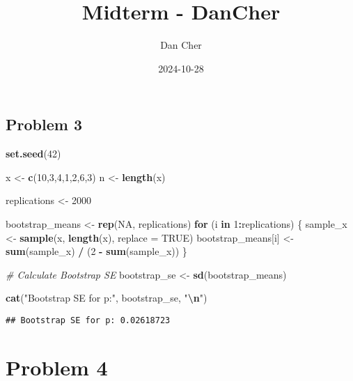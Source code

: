 \documentclass[
]{article}
\title{Midterm - DanCher}
\author{Dan Cher}
\date{2024-10-28}
\newenvironment{Shaded}{\begin{snugshade}}{\end{snugshade}}
\newcommand{\AttributeTok}[1]{\textcolor[rgb]{0.13,0.29,0.53}{#1}}
\newcommand{\CommentTok}[1]{\textcolor[rgb]{0.56,0.35,0.01}{\textit{#1}}}
\newcommand{\ConstantTok}[1]{\textcolor[rgb]{0.56,0.35,0.01}{#1}}
\newcommand{\ControlFlowTok}[1]{\textcolor[rgb]{0.13,0.29,0.53}{\textbf{#1}}}
\newcommand{\DecValTok}[1]{\textcolor[rgb]{0.00,0.00,0.81}{#1}}
\newcommand{\FunctionTok}[1]{\textcolor[rgb]{0.13,0.29,0.53}{\textbf{#1}}}
\newcommand{\NormalTok}[1]{#1}
\newcommand{\OtherTok}[1]{\textcolor[rgb]{0.56,0.35,0.01}{#1}}
\newcommand{\SpecialCharTok}[1]{\textcolor[rgb]{0.81,0.36,0.00}{\textbf{#1}}}
\newcommand{\StringTok}[1]{\textcolor[rgb]{0.31,0.60,0.02}{#1}}
\begin{document}
\maketitle

\subsection{Problem 3}\label{problem-3}

\begin{Shaded}
\begin{Highlighting}[]
\FunctionTok{set.seed}\NormalTok{(}\DecValTok{42}\NormalTok{)}

\NormalTok{x }\OtherTok{\textless{}{-}} \FunctionTok{c}\NormalTok{(}\DecValTok{10}\NormalTok{,}\DecValTok{3}\NormalTok{,}\DecValTok{4}\NormalTok{,}\DecValTok{1}\NormalTok{,}\DecValTok{2}\NormalTok{,}\DecValTok{6}\NormalTok{,}\DecValTok{3}\NormalTok{)}
\NormalTok{n }\OtherTok{\textless{}{-}} \FunctionTok{length}\NormalTok{(x)}

\NormalTok{replications }\OtherTok{\textless{}{-}} \DecValTok{2000}

\NormalTok{bootstrap\_means }\OtherTok{\textless{}{-}} \FunctionTok{rep}\NormalTok{(}\ConstantTok{NA}\NormalTok{, replications)}
\ControlFlowTok{for}\NormalTok{ (i }\ControlFlowTok{in} \DecValTok{1}\SpecialCharTok{:}\NormalTok{replications) \{}
\NormalTok{  sample\_x }\OtherTok{\textless{}{-}} \FunctionTok{sample}\NormalTok{(x, }\FunctionTok{length}\NormalTok{(x), }\AttributeTok{replace =} \ConstantTok{TRUE}\NormalTok{)}
\NormalTok{  bootstrap\_means[i] }\OtherTok{\textless{}{-}} \FunctionTok{sum}\NormalTok{(sample\_x) }\SpecialCharTok{/}\NormalTok{ (}\DecValTok{2} \SpecialCharTok{{-}} \FunctionTok{sum}\NormalTok{(sample\_x))}
\NormalTok{\}}

\CommentTok{\# Calculate Bootstrap SE}
\NormalTok{bootstrap\_se }\OtherTok{\textless{}{-}} \FunctionTok{sd}\NormalTok{(bootstrap\_means)}

\FunctionTok{cat}\NormalTok{(}\StringTok{"Bootstrap SE for p:"}\NormalTok{, bootstrap\_se, }\StringTok{"}\SpecialCharTok{\textbackslash{}n}\StringTok{"}\NormalTok{)}
\end{Highlighting}
\end{Shaded}

\begin{verbatim}
## Bootstrap SE for p: 0.02618723
\end{verbatim}

\section{Problem 4}\label{problem-4}
\end{document}
